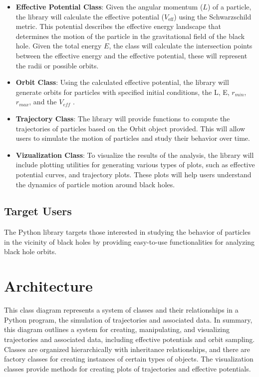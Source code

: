 \documentclass{article}
\begin{document}
\begin{itemize}
\item \textbf{Effective Potential Class}: Given the angular momentum (\( L \)) of a particle, the library will calculate the effective potential (\( V_{\text{eff}} \)) using the Schwarzschild metric.
  This potential describes the effective energy landscape that determines the motion of the particle in the gravitational field of the black hole.
  Given the total energy $E$, the class will calculate the intersection points between the effective energy and the effective potential, these will represent the radii or possible orbits.  
    
\item \textbf{Orbit Class}: Using the calculated effective potential, the library will generate orbits for particles with specified initial conditions, the L, E, $r_{min}$, $r_{max}$, and the $V_{eff}$ .
    
\item \textbf{Trajectory Class}: The library will provide functions to compute the trajectories of particles based on the Orbit object provided. This will allow users to simulate the motion of particles and study their behavior over time.
    
\item \textbf{Vizualization Class}: To visualize the results of the analysis, the library will include plotting utilities for generating various types of plots,
  such as effective potential curves, and trajectory plots. These plots will help users understand the dynamics of particle motion around black holes.
\end{itemize}

\subsection{Target Users}

The Python library targets those interested in studying the behavior of particles in the vicinity of black holes by providing easy-to-use functionalities for analyzing black hole orbits.

\section{Architecture}

This class diagram represents a system of classes and their relationships in a Python program, the simulation of trajectories and associated data. 
In summary, this diagram outlines a system for creating, manipulating, and visualizing trajectories and associated data, including effective potentials and orbit sampling. Classes are organized hierarchically with inheritance relationships, and there are factory classes for creating instances of certain types of objects. The visualization classes provide methods for creating plots of trajectories and effective potentials.
\end{document}
